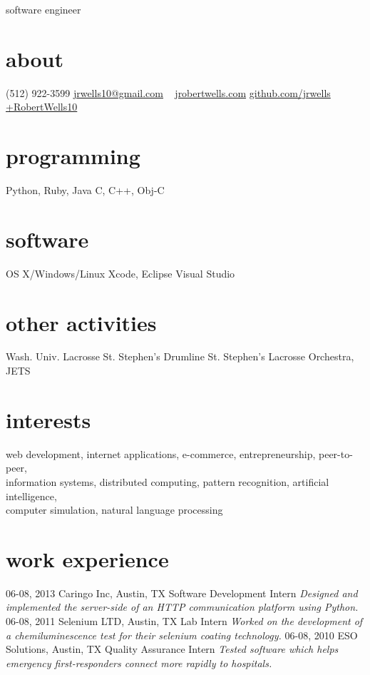 \documentclass[]{cv}
\begin{document}
       {software engineer}

\begin{aside}
  \section{about}
    (512) 922-3599
    \href{mailto:jrwells10@gmail.com}{jrwells10@gmail.com}
    ~
    \href{http://jrobertwells.com}{jrobertwells.com}
    \href{http://github.com/jrwells}{github.com/jrwells}
    \href{http://google.com/+RobertWells10}{+RobertWells10}
  \section{programming}
    Python, Ruby, Java
    C, C++, Obj-C
  \section{software}
    OS X/Windows/Linux
    Xcode, Eclipse
    Visual Studio
  \section{other activities}
    Wash. Univ. Lacrosse
    St. Stephen's Drumline
    St. Stephen's Lacrosse
    Orchestra, JETS
\end{aside}

\section{interests}

web development, internet applications, e-commerce, entrepreneurship, peer-to-peer, \\
information systems, distributed computing, pattern recognition, artificial intelligence, \\
computer simulation, natural language processing

\section{work experience}

\begin{entrylist}
  \entry
    {06-08, 2013}
    {Caringo Inc, Austin, TX}
    {Software Development Intern}
    {\emph{Designed and implemented the server-side of an HTTP communication platform using Python.}}
  \entry
    {06-08, 2011}
    {Selenium LTD, Austin, TX}
    {Lab Intern}
    {\emph{Worked on the development of a chemiluminescence test for their selenium coating technology.}}
  \entry
    {06-08, 2010}
    {ESO Solutions, Austin, TX}
    {Quality Assurance Intern}
    {\emph{Tested software which helps emergency first-responders connect more rapidly to hospitals.}}
\end{entrylist}
\end{document}
